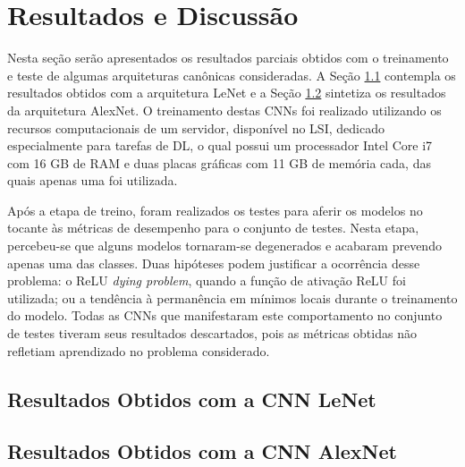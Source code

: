 
\chapter{Resultados e Discussão} \label{cap:resultados}

Nesta seção serão apresentados os resultados parciais obtidos com o treinamento e teste de algumas arquiteturas canônicas consideradas. A Seção \ref{sec:lenet}  contempla os resultados obtidos com a arquitetura LeNet e a Seção  \ref{sec:alexnet} sintetiza os resultados da arquitetura AlexNet. O treinamento destas CNNs foi realizado utilizando os recursos computacionais de um servidor, disponível no LSI, dedicado especialmente para tarefas de DL, o qual possui um processador Intel Core i7 com 16 GB de RAM e duas placas gráficas com 11 GB de memória cada, das quais apenas uma foi utilizada.

Após a etapa de treino, foram realizados os testes para aferir os modelos no tocante às métricas de desempenho para o conjunto de testes. Nesta etapa, percebeu-se que alguns modelos tornaram-se degenerados e acabaram prevendo apenas uma das classes. Duas hipóteses podem justificar a ocorrência desse problema: o ReLU \emph{dying problem}, quando a função de ativação ReLU foi utilizada; ou a tendência à permanência em mínimos locais durante o treinamento do modelo. Todas as CNNs que manifestaram este comportamento no conjunto de testes tiveram seus resultados descartados, pois as métricas obtidas não refletiam aprendizado no problema considerado.


\section{Resultados Obtidos com a CNN LeNet}
\label{sec:lenet}


\section{Resultados Obtidos com a CNN AlexNet}
\label{sec:alexnet}

